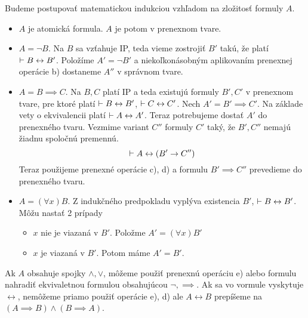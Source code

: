 \begin{dokaz}
Budeme postupovať matematickou indukciou vzhľadom na zložitosť formuly $A$.
\begin{itemize}
    \item $A$ je atomická formula. $A$ je potom v prenexnom tvare.

    \item $A=\neg B$. Na $B$ sa vzťahuje IP, teda vieme zostrojiť
        $B'$ takú, že platí
        $\vdash B \leftrightarrow B'$.
        Položíme $A'=\neg B'$ a niekoľkonásobným aplikovaním 
        prenexnej operácie b) dostaneme 
        $A''$ v správnom tvare.

    \item $A=B \implies C$. Na $B,C$ platí IP a teda existujú formuly
        $B',C'$ v prenexnom tvare, pre ktoré platí
        $\vdash B \leftrightarrow B'$, $\vdash C \leftrightarrow C'$.
        Nech $A' = B' \implies C'$. Na základe vety o ekvivalencii platí
        $\vdash A \leftrightarrow A'$. Teraz potrebujeme dostať
        $A'$ do prenexného tvaru.
        Vezmime variant $C''$ formuly $C'$ taký, že $B',C''$ nemajú
        žiadnu spoločnú premennú.
        \begin{equation*}
            \vdash A \leftrightarrow (B' \rightarrow C'')
        \end{equation*}
        Teraz použijeme prenexné operácie c), d) a formulu
        $B' \implies C''$ prevedieme do prenexného tvaru.

    \item $A=(\forall x)B$. Z indukčného predpokladu vyplýva
        existencia $B'$, $\vdash B \leftrightarrow B'$.
        Môžu nastať 2 prípady
        \begin{itemize}
        \item $x$ nie je viazaná v $B'$. Položme $A' = (\forall x) B'$
        \item $x$ je viazaná v $B'$. Potom máme $A' = B'$.
        \end{itemize}
\end{itemize}
\end{dokaz}
\begin{poznamka}
    Ak $A$ obsahuje spojky 
    $\land,\lor$, môžeme použiť prenexnú operáciu e) alebo formulu nahradiť
    ekvivaletnou formulou obsahujúcou $\neg,\implies$.
    Ak sa vo vormule vyskytuje $\leftrightarrow$, nemôžeme priamo
    použiť operácie e), d) ale $A\leftrightarrow B$ prepíšeme na
    $(A\implies B) \land (B \implies A)$.
\end{poznamka}

